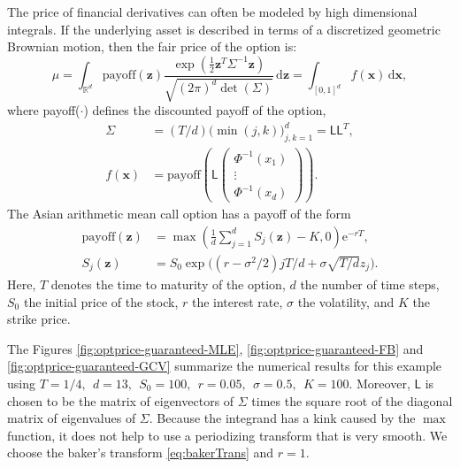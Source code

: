 \documentclass[twocolumn]{svjour3}          %
\newcommand{\bm}[1]{\boldsymbol{#1}}
\newcommand{\mSigma}{\mathsf{\Sigma}}
\newcommand{\dif}[1]{\text{d}{#1}}
\newcommand{\reals}{\mathbb{R}}
\newcommand{\vx}{\bm{x}}
\newcommand{\dvx}{\dif{\bm{x}}}
\newcommand{\vz}{\bm{z}}
\newcommand{\dvz}{\dif{\bm{z}}}
\newcommand{\mL}{\mathsf{L}}
\newcommand{\me}{\mathrm{e}}
\begin{document}
The price of financial derivatives can often be modeled by high dimensional integrals. If the underlying asset is described in terms of a discretized geometric Brownian motion, then the fair price of the option is:
\begin{equation*}
\mu = \int_{\reals^d} \text{payoff}(\vz) \frac{\exp(\frac 12 \vz^T\mSigma^{-1}\vz)}{\sqrt{(2\pi)^d \det(\mSigma)}} \, \dvz = \int_{[0,1]^d} f(\vx) \, \dvx,
\end{equation*} 
where {payoff($\cdot$)} defines the discounted payoff of the option,
\begin{align*}
\mSigma &= (T/d) \bigl(\min(j,k) \bigr)_{j,k=1}^d = \mL \mL^T,\\
f(\vx) &= \text{payoff} \left(\mL 
\begin{pmatrix}
\Phi^{-1}(x_1) \\ \vdots \\ \Phi^{-1}(x_d)
\end{pmatrix} \right).
\end{align*}
The Asian arithmetic mean call option has a payoff of the form
\begin{align*}
\text{payoff}(\vz) &= \max\left( \frac 1d  \sum_{j=1}^d S_j(\vz) - K, 0 \right) \me^{-r T}, \\
S_j(\vz) &= S_0 \exp\bigl((r-\sigma^2/2)jT/d + \sigma \sqrt{T/d} z_j \bigr).
\end{align*}
Here, $T$ denotes the time to maturity of the option, $d$ the number of time steps, $S_0$ the initial price of the stock, $r$ the interest rate, $\sigma$ the volatility, and $K$ the strike price.  

The Figures \ref{fig:optprice-guaranteed-MLE}, \ref{fig:optprice-guaranteed-FB} and 
\ref{fig:optprice-guaranteed-GCV} summarize the numerical results for this example using
$
T = 1/4, \ \ d = 13, \ \ S_0 = 100, \ \ r =  0.05, \ \ \sigma = 0.5, \ \ K = 100.
$
Moreover, $\mL$ is chosen to be the matrix of eigenvectors of $\mSigma$ times the square root of the diagonal matrix of eigenvalues of $\mSigma$.
Because the integrand has a kink caused by the $\max$ function, it does not help to use a periodizing transform that is very smooth.  We choose the baker's transform \eqref{eq:bakerTrans} and $r = 1$.
\end{document}
